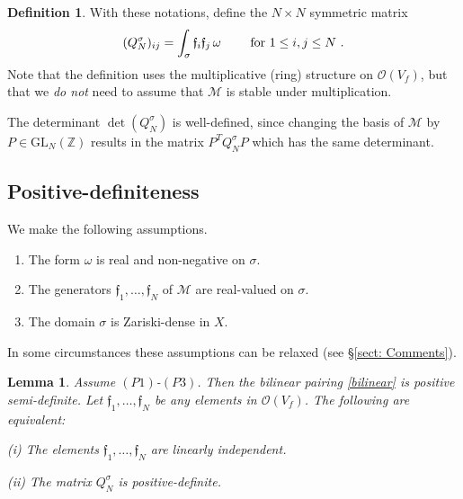 \documentclass[a4paper,10pt]{amsart}
\newtheorem{lem}[thm]{Lemma}
\theoremstyle{definition}
\newtheorem{defn}[thm]{Definition}
\theoremstyle{remark}
\numberwithin{equation}{section}
\newcommand{\Z}{\mathbb Z}
\newcommand{\Or}{\mathcal{O}}
\newcommand{\ff}{\mathfrak{f}}
\newcommand{\0}{\color{blue}{\mathsf{0}}}
\begin{document}
\begin{defn} With these notations, define the $N\times N$ symmetric matrix 
\[ (Q^{\sigma}_N)_{ij} =   \int_{\sigma}  \ff_i \ff_j \, \omega   \qquad \hbox{ for  }   1\leq i,j\leq N \ . \] 
Note that the definition uses the multiplicative (ring) structure on  $\Or(V_f)$, but that we \emph{do not}  need to  assume that   $\mathcal{M}$ is stable under multiplication. 
\end{defn} 
The determinant $\det(Q^{\sigma}_N)$ is well-defined, since 
changing the basis of $\mathcal{M}$ by   $P \in \mathrm{GL}_N(\Z)$ results in the matrix 
$P^T  Q^{\sigma}_N P$ which has the same determinant. 



\subsection{Positive-definiteness}
We make the following  assumptions.
\begin{enumerate} [label=(P\arabic*)] 
\item  The form $\omega$ is real and non-negative on $\sigma$.
\item The generators  $\ff_1,\ldots, \ff_N$ of $\mathcal{M}$ are real-valued on $\sigma$.
\item The domain $\sigma$ is Zariski-dense in $X$.
\end{enumerate}
In some  circumstances these assumptions can  be relaxed (see \S \ref{sect: Comments}).


\begin{lem}  \label{lem: posdefinite} Assume $(P1)$-$(P3)$. Then  the bilinear pairing \eqref{bilinear} is positive semi-definite. 
Let $\ff_1,\ldots, \ff_N $ be any elements in $\mathcal{O}(V_f)$.  The following are equivalent:

(i) The elements $\ff_1,\ldots, \ff_N$  are linearly independent. 

(ii)  The matrix  $Q^{\sigma}_{N}$ is positive-definite.
\end{lem} 
\end{document}
